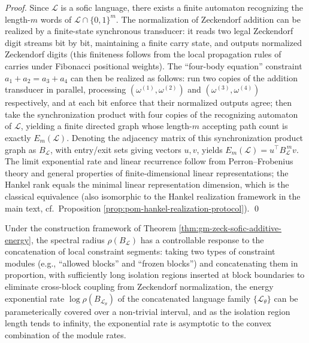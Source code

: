 \begin{proof}
Since \(\mathcal{L}\) is a sofic language, there exists a finite automaton recognizing the length-\(m\) words of \(\mathcal{L}\cap\{0,1\}^m\).
The normalization of Zeckendorf addition can be realized by a finite-state synchronous transducer: it reads two legal Zeckendorf digit streams bit by bit, maintaining a finite carry state, and outputs normalized Zeckendorf digits (this finiteness follows from the local propagation rules of carries under Fibonacci positional weights).
The ``four-body equation'' constraint \(a_1+a_2=a_3+a_4\) can then be realized as follows: run two copies of the addition transducer in parallel, processing \((\omega^{(1)},\omega^{(2)})\) and \((\omega^{(3)},\omega^{(4)})\) respectively, and at each bit enforce that their normalized outputs agree; then take the synchronization product with four copies of the recognizing automaton of \(\mathcal{L}\), yielding a finite directed graph whose length-\(m\) accepting path count is exactly \(E_m(\mathcal{L})\).
Denoting the adjacency matrix of this synchronization product graph as \(B_{\mathcal{L}}\), with entry/exit sets giving vectors \(u,v\), yields \(E_m(\mathcal{L})=u^\top B_{\mathcal{L}}^{\,m}v\).
The limit exponential rate and linear recurrence follow from Perron--Frobenius theory and general properties of finite-dimensional linear representations; the Hankel rank equals the minimal linear representation dimension, which is the classical equivalence (also isomorphic to the Hankel realization framework in the main text, cf.\ Proposition \ref{prop:pom-hankel-realization-protocol}). \qed
\end{proof}

\begin{proposition}\label{prop:gm-energy-rate-tunable}
Under the construction framework of Theorem \ref{thm:gm-zeck-sofic-additive-energy}, the spectral radius \(\rho(B_{\mathcal{L}})\) has a controllable response to the concatenation of local constraint segments: taking two types of constraint modules (e.g., ``allowed blocks'' and ``frozen blocks'') and concatenating them in proportion, with sufficiently long isolation regions inserted at block boundaries to eliminate cross-block coupling from Zeckendorf normalization, the energy exponential rate
\(\log\rho(B_{\mathcal{L}_\theta})\)
of the concatenated language family \(\{\mathcal{L}_\theta\}\) can be parameterically covered over a non-trivial interval, and as the isolation region length tends to infinity, the exponential rate is asymptotic to the convex combination of the module rates.
\end{proposition}

